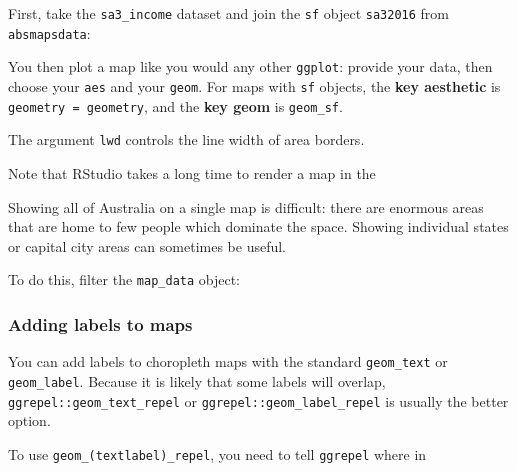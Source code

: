 \documentclass[]{book}
\newenvironment{Shaded}{\begin{snugshade}}{\end{snugshade}}
\newcommand{\DataTypeTok}[1]{\textcolor[rgb]{0.13,0.29,0.53}{#1}}
\newcommand{\KeywordTok}[1]{\textcolor[rgb]{0.13,0.29,0.53}{\textbf{#1}}}
\newcommand{\NormalTok}[1]{#1}
\newcommand{\OperatorTok}[1]{\textcolor[rgb]{0.81,0.36,0.00}{\textbf{#1}}}
\newcommand{\StringTok}[1]{\textcolor[rgb]{0.31,0.60,0.02}{#1}}
\begin{document}
First, take the \texttt{sa3\_income} dataset and join the \texttt{sf} object \texttt{sa32016} from \texttt{absmapsdata}:

\begin{Shaded}
\end{Shaded}

You then plot a map like you would any other \texttt{ggplot}: provide your data, then choose your \texttt{aes} and your \texttt{geom}. For maps with \texttt{sf} objects, the \textbf{key aesthetic} is \texttt{geometry\ =\ geometry}, and the \textbf{key geom} is \texttt{geom\_sf}.

The argument \texttt{lwd} controls the line width of area borders.

Note that RStudio takes a long time to render a map in the

Showing all of Australia on a single map is difficult: there are enormous areas that are home to few people which dominate the space. Showing individual states or capital city areas can sometimes be useful.

To do this, filter the \texttt{map\_data} object:

\hypertarget{adding-labels-to-maps}{%
\subsubsection{Adding labels to maps}\label{adding-labels-to-maps}}

You can add labels to choropleth maps with the standard \texttt{geom\_text} or \texttt{geom\_label}. Because it is likely that some labels will overlap, \texttt{ggrepel::geom\_text\_repel} or \texttt{ggrepel::geom\_label\_repel} is usually the better option.

To use \texttt{geom\_(text\textbar{}label)\_repel}, you need to tell \texttt{ggrepel} where in
\end{document}
